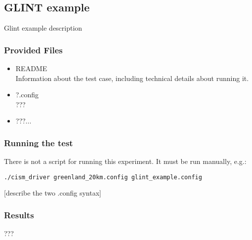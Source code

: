 \subsection{GLINT example}
\label{sec:glint_example}

Glint example description

\subsubsection{Provided Files}

\begin{itemize}
	\item README \\
		Information about the test case, including technical details about running it.
\item ?.config \\
  ???
\item ???... \\
\end{itemize}

\subsubsection{Running the test}
There is not a script for running this experiment.  It must be run manually, e.g.: 

\texttt{./cism\_driver greenland\_20km.config glint\_example.config}

[describe the two .config syntax]

\subsubsection{Results}
???


